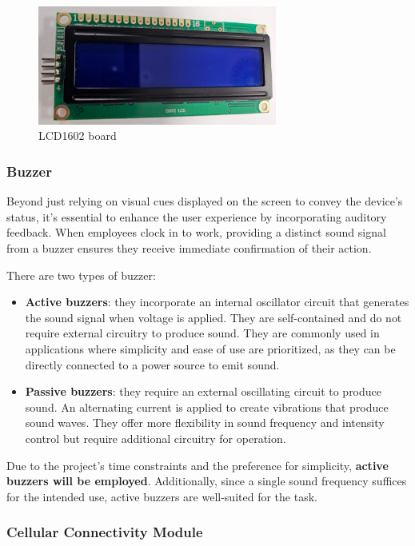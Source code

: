 \begin{figure}[h]
	\centering
	\includegraphics[width = 0.7\textwidth]{Imagenes/Vectorial/LCD1602.pdf}
	\caption{LCD1602 board}
	\label{fig:lcd1602}
\end{figure}


\subsubsection*{Buzzer}

Beyond just relying on visual cues displayed on the screen to convey the device's status, it's essential to enhance 
the user experience by incorporating auditory feedback. When employees clock in to work, providing a distinct sound 
signal from a buzzer ensures they receive immediate confirmation of their action.

There are two types of buzzer:
\begin{itemize}
	\item \textbf{Active buzzers}: they incorporate an internal oscillator circuit that generates the sound signal 
	when voltage is applied. They are self-contained and do not require external circuitry to produce sound. They 
	are commonly used in applications where simplicity and ease of use are prioritized, as they can be directly 
	connected to a power source to emit sound.
	\item \textbf{Passive buzzers}: they require an external oscillating circuit to produce sound. An alternating 
	current is applied to create vibrations that produce sound waves. They offer more flexibility in sound frequency 
	and intensity control but require additional circuitry for operation.
\end{itemize}

Due to the project's time constraints and the preference for simplicity, \textbf{active buzzers will be employed}. 
Additionally, since a single sound frequency suffices for the intended use, active buzzers are well-suited for the task.


\subsubsection*{Cellular Connectivity Module}

